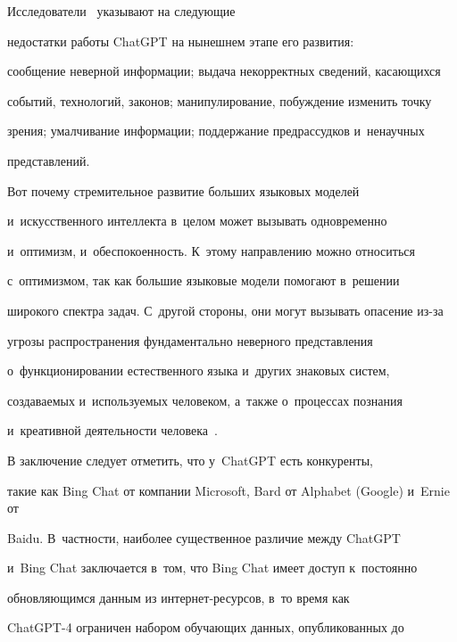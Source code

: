    


   Исследователи~\cite{14-eg, 15-eg, 17-eg} указывают на сле\-ду\-ющие 


недостатки работы \mbox{ChatGPT} на нынешнем этапе его раз\-ви\-тия: 


сообщение неверной информации; выдача некорректных сведений, ка\-са\-ющих\-ся 


событий, технологий, законов; манипулирование, по\-буж\-де\-ние изменить точ\-ку 


зрения; умал\-чи\-ва\-ние информации; под\-дер\-жа\-ние предрассудков и~ненаучных 


пред\-став\-ле\-ний.


   


   Вот почему стремительное развитие больших языковых моделей 


и~искусственного интеллекта в~целом может вызывать одновременно 


и~оптимизм, и~обеспо\-ко\-ен\-ность. К~этому на\-прав\-ле\-нию мож\-но относиться 


с~оптимизмом, так как большие языковые модели помогают в~решении 


широкого спект\-ра задач. С~другой стороны, они могут вызывать опасение из-за 


угро\-зы распространения фундаментально не\-вер\-но\-го пред\-став\-ле\-ния 


о~функционировании естественного языка и~других знаковых сис\-тем, 


создаваемых и~ис\-поль\-зу\-емых человеком, а~так\-же о~процессах по\-зна\-ния 


и~креативной дея\-тель\-ности человека~\cite{14-eg, 17-eg, 18-eg}.


   


   В заключение следует отметить, что у~\mbox{ChatGPT} есть конкуренты, 


такие как Bing Chat от компании Microsoft, Bard от \mbox{Alphabet} (\mbox{Google}) и~\mbox{Ernie} от 


\mbox{Baidu}. В~част\-ности, наиболее существенное различие меж\-ду \mbox{ChatGPT} 


и~Bing Chat заключается в~том, что Bing Chat имеет до\-ступ к~постоянно 


об\-нов\-ля\-ющим\-ся данным из ин\-тер\-нет-ре\-сур\-сов, в~то время как 


\mbox{ChatGPT-4} ограничен набором обуча\-ющих данных, опуб\-ли\-ко\-ван\-ных до 


